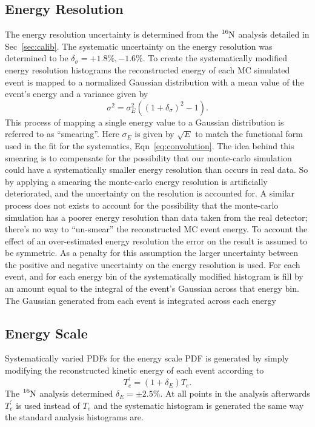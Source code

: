 \subsection{Energy Resolution}
The energy resolution uncertainty is determined from the $\ce{^{16}N}$ analysis
detailed in Sec~\ref{sec:calib}.
The systematic uncertainty on the energy resolution was determined to be $\delta_{\sigma} = +1.8\%, -1.6\%$. %
To create the systematically modified energy resolution histograms the reconstructed
energy of each MC simulated event is mapped to a normalized Gaussian distribution with a
mean value of the event's energy and a
variance given by
\begin{equation}
  \sigma^{2} = \sigma_{E}^{2}\left(\left(1 + \delta_{\sigma}\right)^2 - 1\right)\text{.}
  \label{eqn:systmatic_esmear}
\end{equation}
This process of mapping a single energy value to a Gaussian distribution is
referred to as ``smearing''.
Here $\sigma_{E}$ is given by $\sqrt{E}$ to match the functional form used in
the fit for the systematics, Eqn~\ref{eq:convolution}.
The idea behind this smearing is to compensate for the possibility that our
monte-carlo simulation could have a systematically smaller energy resolution
than occurs in real data.
So by applying a smearing the monte-carlo energy resolution is artificially
deteriorated, and the uncertainty on the resolution is accounted for.
A similar process does not exists to account for the possibility that the
monte-carlo simulation has a poorer energy resolution than data taken from the
real detector; there's no way to ``un-smear'' the reconstructed MC event
energy.
To account the effect of an over-estimated energy resolution the error on
the result is assumed to be symmetric.
As a penalty for this assumption the larger uncertainty between the positive
and negative uncertainty on the energy resolution is used.
For each event, and for each energy bin of the systematically modified histogram
is fill by an amount equal to the integral of the event's Gaussian across that
energy bin.
The Gaussian generated from each event is integrated across each energy

\subsection{Energy Scale}
Systematically varied PDFs for the energy scale PDF is generated by simply
modifying the reconstructed kinetic energy of each event according to
\begin{equation}
  T^{\prime}_{e} = (1+\delta_{E})T_{e}\text{.}
\end{equation}
The $\ce{^{16}N}$ analysis determined $\delta_{E} = \pm 2.5\%$.
At all points in the analysis afterwards $T^{\prime}_{e}$ is used instead of $T_{e}$
and the systematic histogram is generated the same way the standard analysis histograms
are.

